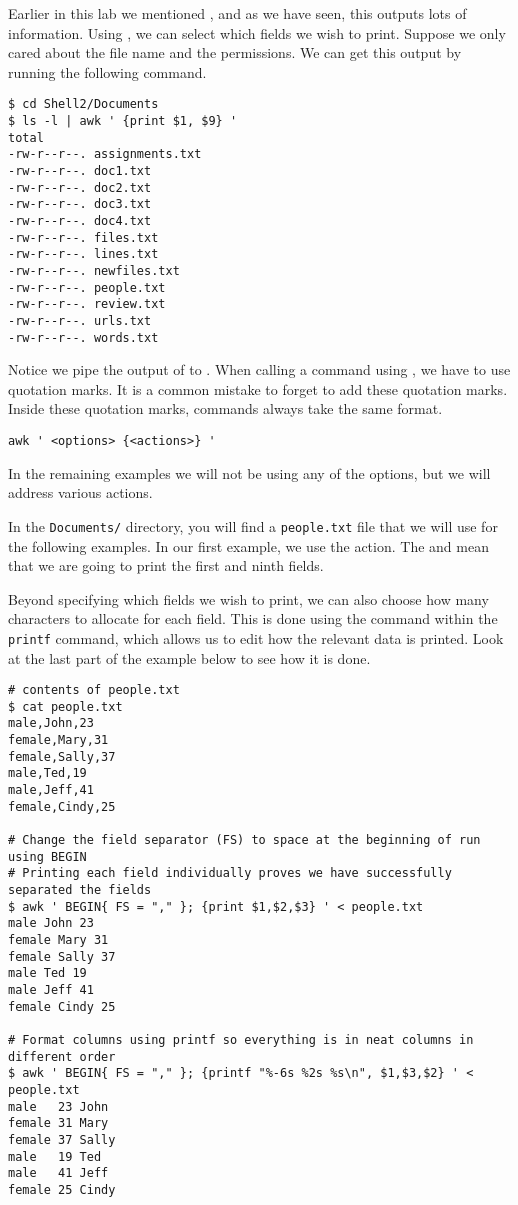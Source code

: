 Earlier in this lab we mentioned , and as we have seen, this outputs lots of information.
Using , we can select which fields we wish to print.
Suppose we only cared about the file name and the permissions.
We can get this output by running the following command.

\begin{lstlisting}
$ cd Shell2/Documents
$ ls -l | awk ' {print $1, $9} '
total 
-rw-r--r--. assignments.txt
-rw-r--r--. doc1.txt
-rw-r--r--. doc2.txt
-rw-r--r--. doc3.txt
-rw-r--r--. doc4.txt
-rw-r--r--. files.txt
-rw-r--r--. lines.txt
-rw-r--r--. newfiles.txt
-rw-r--r--. people.txt
-rw-r--r--. review.txt
-rw-r--r--. urls.txt
-rw-r--r--. words.txt
\end{lstlisting}

Notice we pipe the output of  to .
When calling a command using , we have to use quotation marks.
It is a common mistake to forget to add these quotation marks.
Inside these quotation marks, commands always take the same format.

\begin{lstlisting}
awk ' <options> {<actions>} '
\end{lstlisting}

In the remaining examples we will not be using any of the options, but we will address various actions.

In the \texttt{Documents/} directory, you will find a \texttt{people.txt} file that we will use for the following examples.
In our first example, we use the  action.
The  and  mean that we are going to print the first and ninth fields.

Beyond specifying which fields we wish to print, we can also choose how many characters to allocate for each field.
This is done using the \li{\%} command within the \texttt{printf} command, which allows us to edit how the relevant data is printed.
Look at the last part of the example below to see how it is done.

\begin{lstlisting}
# contents of people.txt
$ cat people.txt
male,John,23
female,Mary,31
female,Sally,37
male,Ted,19
male,Jeff,41
female,Cindy,25

# Change the field separator (FS) to space at the beginning of run using BEGIN 
# Printing each field individually proves we have successfully separated the fields
$ awk ' BEGIN{ FS = "," }; {print $1,$2,$3} ' < people.txt
male John 23
female Mary 31
female Sally 37
male Ted 19
male Jeff 41
female Cindy 25

# Format columns using printf so everything is in neat columns in different order
$ awk ' BEGIN{ FS = "," }; {printf "%-6s %2s %s\n", $1,$3,$2} ' < people.txt
male   23 John
female 31 Mary
female 37 Sally
male   19 Ted
male   41 Jeff
female 25 Cindy
\end{lstlisting}

